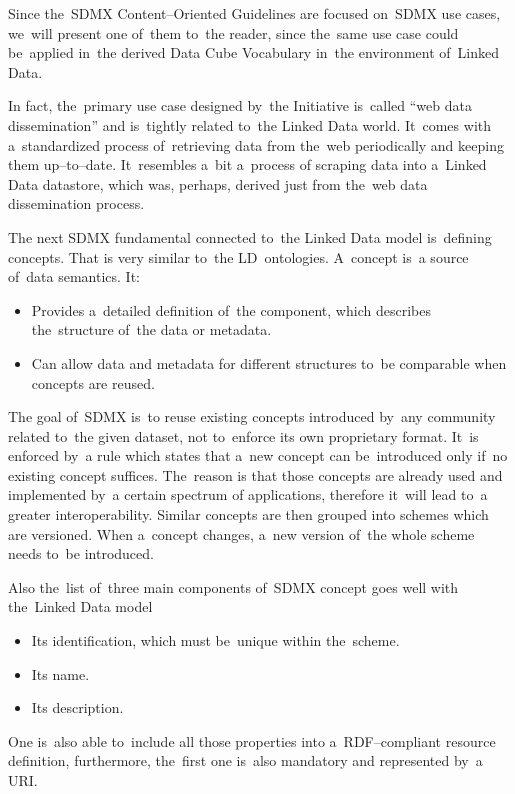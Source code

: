 Since the~SDMX Content--Oriented Guidelines are focused on~SDMX use cases, we~will present
one of~them to~the reader, since the~same use case could be~applied in~the derived Data Cube
Vocabulary in~the environment of~Linked Data.

In fact, the~primary use case designed by~the Initiative is~called “web data dissemination”
and is~tightly related to~the Linked Data world. It~comes with a~standardized process of~retrieving
data from the~web periodically and keeping them up--to--date. It~resembles a~bit a~process
of scraping data into a~Linked Data datastore, which was, perhaps, derived just from the~web
data dissemination process.

The next SDMX fundamental connected to~the Linked Data model is~defining concepts. That is
very similar to~the LD~ontologies. A~concept is~a source of~data semantics. It:

\begin{itemize}
\item Provides a~detailed definition of~the component, which describes the~structure of~the data or
metadata.
\item Can allow data and metadata for different structures to~be comparable when concepts are reused.
\end{itemize}

The goal of~SDMX is~to reuse existing concepts introduced by~any community related to~the
given dataset, not to~enforce its own proprietary format. It~is enforced by~a rule which states
that a~new concept can be~introduced only if~no existing concept suffices. The~reason
is that those concepts are already used and implemented by~a certain spectrum of
applications, therefore it~will lead to~a greater interoperability. Similar concepts are then
grouped into schemes which are versioned. When a~concept changes, a~new version of~the
whole scheme needs to~be introduced.

Also the~list of~three main components of~SDMX concept goes well with the~Linked Data model

\begin{itemize}
\item Its identification, which must be~unique within the~scheme.
\item Its name.
\item Its description.
\end{itemize}

One is~also able to~include all those properties into a~RDF--compliant resource definition,
furthermore, the~first one is~also mandatory and represented by~a URI.

